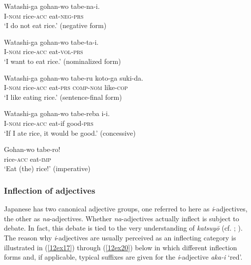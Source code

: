 \documentclass[output=paper,colorlinks,citecolor=brown]{langscibook}
\begin{document}
\begin{exe}
	\ex \label{12ex12}
	\gll Watashi-ga gohan-wo tabe-na-i. \\
	I-\textsc{nom} rice-\textsc{acc} eat-\textsc{neg-prs} \\
	\trans `I do not eat rice.' \hfill (negative form)
	
	\ex \label{12ex13}
	\gll Watashi-ga gohan-wo tabe-ta-i. \\
	I-\textsc{nom} rice-\textsc{acc} eat-\textsc{vol-prs} \\
	\trans `I want to eat rice.' \hfill (nominalized form)
	
	\ex \label{12ex14}
	\gll Watashi-ga gohan-wo tabe-ru koto-ga suki-da. \\
	I-\textsc{nom} rice-\textsc{acc} eat-\textsc{prs} \textsc{comp-nom} like-\textsc{cop} \\
	\trans `I like eating rice.' \hfill (sentence-final form)
	
	\ex \label{12ex15}
	\gll Watashi-ga gohan-wo tabe-reba i-i. \\
	I-\textsc{nom} rice-\textsc{acc} eat-if good-\textsc{prs} \\
	\trans `If I ate rice, it would be good.' \hfill (concessive)
	
	\ex \label{12ex16}
	\gll Gohan-wo tabe-ro! \\
	rice-\textsc{acc} eat-\textsc{imp} \\
	\trans `Eat (the) rice!' \hfill (imperative)
\end{exe}

\subsubsection{Inflection of adjectives} \label{12sec3.2.2}

Japanese has two canonical adjective groups, one referred to here as \emph{i}-adjectives, the other as \emph{na}-adjectives. Whether \emph{na}-adjectives actually inflect is subject to debate. In fact, this debate is tied to the very understanding of \emph{katsuyō} (cf. \citealt[59--64]{uehara1998}; \citealt{kishimotouehara2016}). The reason why \emph{i}-adjectives are usually perceived as an inflecting category is illustrated in (\ref{12ex17}) through (\ref{12ex20}) below in which different inflection forms and, if applicable, typical suffixes are given for the \emph{i}-adjective \emph{aka-i} `red'.
\end{document}
